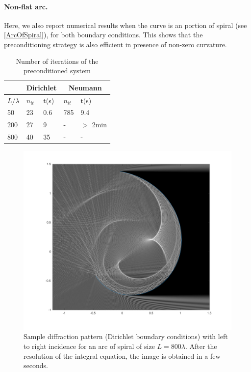 \documentclass[a4paper]{article}
\begin{document}
\paragraph{Non-flat arc.} Here, we also report numerical results when the curve is an portion of spiral (see \autoref{ArcOfSpiral}), for both boundary conditions. This shows that the preconditioning strategy is also efficient in presence of non-zero curvature. 
\begin{table}[H]
	\begin{center}
		\begin{tabular}{|| m{4em} | m{4em} | m{4em} | m{4em} | m{4em}||} 
			\hline
			\multicolumn{1}{||c|}{ }&
			\multicolumn{2}{c|}{Dirichlet}&\multicolumn{2}{c||}{Neumann}\\
			\hline
			$L/\lambda$ & $n_{it}$& t(s) & $n_{it}$ & t(s)\\
			\hline\hline
			50 & 23 & 0.6 & 785 & 9.4\\
			\hline
			200 & 27 & 9 & - &  $>$ 2min\\
			\hline
			800 & 40 & 35 & - & -\\
			\hline
		\end{tabular}
	\end{center}
	\caption{Number of iterations of the preconditioned system }
	\label{TableNitTimeHlemholtzDirSpiral}
\end{table}
\begin{figure}[H]
	\centering
	\includegraphics[width=1\linewidth]{figs/arcOfSpiral800_3}
	\caption{Sample diffraction pattern (Dirichlet boundary conditions) with left to right incidence for an arc of spiral of size $L = 800 \lambda$. After the resolution of the integral equation, the image is obtained in a few seconds.}
	\label{ArcOfSpiral}
\end{figure}
\end{document}
